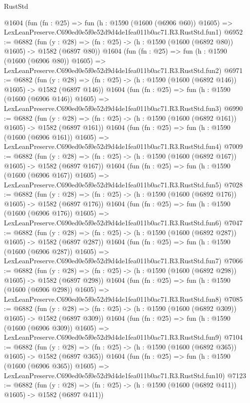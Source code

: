 \begin{lexlean}{RustStd}
\begin{coremodule}
    @1604
    (fun (fn : @25) =>
    fun (h : @1590 (@1600 (@6906 @60)) @1605) =>
    LexLeanPreserve.C690ed0e5f0e52d9d4de1fea011b0ac71.R3.RustStd.fun1)
@6952 := @6882
    (fun (y : @28) => (fn : @25) -> (h : @1590 (@1600 (@6892 @80)) @1605) -> @1582 (@6897 @80))
    @1604
    (fun (fn : @25) =>
    fun (h : @1590 (@1600 (@6906 @80)) @1605) =>
    LexLeanPreserve.C690ed0e5f0e52d9d4de1fea011b0ac71.R3.RustStd.fun2)
@6971 := @6882
    (fun (y : @28) => (fn : @25) -> (h : @1590 (@1600 (@6892 @146)) @1605) -> @1582 (@6897 @146))
    @1604
    (fun (fn : @25) =>
    fun (h : @1590 (@1600 (@6906 @146)) @1605) =>
    LexLeanPreserve.C690ed0e5f0e52d9d4de1fea011b0ac71.R3.RustStd.fun3)
@6990 := @6882
    (fun (y : @28) => (fn : @25) -> (h : @1590 (@1600 (@6892 @161)) @1605) -> @1582 (@6897 @161))
    @1604
    (fun (fn : @25) =>
    fun (h : @1590 (@1600 (@6906 @161)) @1605) =>
    LexLeanPreserve.C690ed0e5f0e52d9d4de1fea011b0ac71.R3.RustStd.fun4)
@7009 := @6882
    (fun (y : @28) => (fn : @25) -> (h : @1590 (@1600 (@6892 @167)) @1605) -> @1582 (@6897 @167))
    @1604
    (fun (fn : @25) =>
    fun (h : @1590 (@1600 (@6906 @167)) @1605) =>
    LexLeanPreserve.C690ed0e5f0e52d9d4de1fea011b0ac71.R3.RustStd.fun5)
@7028 := @6882
    (fun (y : @28) => (fn : @25) -> (h : @1590 (@1600 (@6892 @176)) @1605) -> @1582 (@6897 @176))
    @1604
    (fun (fn : @25) =>
    fun (h : @1590 (@1600 (@6906 @176)) @1605) =>
    LexLeanPreserve.C690ed0e5f0e52d9d4de1fea011b0ac71.R3.RustStd.fun6)
@7047 := @6882
    (fun (y : @28) => (fn : @25) -> (h : @1590 (@1600 (@6892 @287)) @1605) -> @1582 (@6897 @287))
    @1604
    (fun (fn : @25) =>
    fun (h : @1590 (@1600 (@6906 @287)) @1605) =>
    LexLeanPreserve.C690ed0e5f0e52d9d4de1fea011b0ac71.R3.RustStd.fun7)
@7066 := @6882
    (fun (y : @28) => (fn : @25) -> (h : @1590 (@1600 (@6892 @298)) @1605) -> @1582 (@6897 @298))
    @1604
    (fun (fn : @25) =>
    fun (h : @1590 (@1600 (@6906 @298)) @1605) =>
    LexLeanPreserve.C690ed0e5f0e52d9d4de1fea011b0ac71.R3.RustStd.fun8)
@7085 := @6882
    (fun (y : @28) => (fn : @25) -> (h : @1590 (@1600 (@6892 @309)) @1605) -> @1582 (@6897 @309))
    @1604
    (fun (fn : @25) =>
    fun (h : @1590 (@1600 (@6906 @309)) @1605) =>
    LexLeanPreserve.C690ed0e5f0e52d9d4de1fea011b0ac71.R3.RustStd.fun9)
@7104 := @6882
    (fun (y : @28) => (fn : @25) -> (h : @1590 (@1600 (@6892 @365)) @1605) -> @1582 (@6897 @365))
    @1604
    (fun (fn : @25) =>
    fun (h : @1590 (@1600 (@6906 @365)) @1605) =>
    LexLeanPreserve.C690ed0e5f0e52d9d4de1fea011b0ac71.R3.RustStd.fun10)
@7123 := @6882
    (fun (y : @28) => (fn : @25) -> (h : @1590 (@1600 (@6892 @411)) @1605) -> @1582 (@6897 @411))

\end{coremodule}
\end{lexlean}
